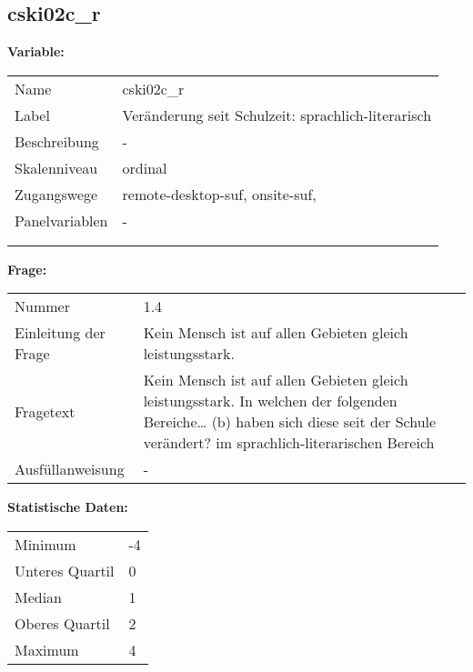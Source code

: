 	
	
	\subsection{cski02c\_r}
	\label{subSection:cski02c_r}

	\noindent\textbf{Variable:}\\
		\begin{tabular}{lL{11.3cm}}
			\label{tableVariable:cski02c_r}
			Name & cski02c\_r \\
			Label & Veränderung seit Schulzeit: sprachlich-literarisch \\
			Beschreibung & - \\
			Skalenniveau & ordinal \\
			Zugangswege &
				remote-desktop-suf,
				onsite-suf,
 \\
			Panelvariablen & -
			 \\
			 \\
 \\
		\end{tabular}

		\vspace*{1 cm}
		\noindent\textbf{Frage:}\\
		\begin{tabular}{lL{11.3cm}}
			\label{tableQuestion:cski02c_r}
			Nummer & 1.4 \\
			Einleitung der Frage & Kein Mensch ist auf allen Gebieten gleich leistungsstark. \\
			Fragetext & Kein Mensch ist auf allen Gebieten gleich leistungsstark. In welchen der folgenden Bereiche…
(b) haben sich diese seit der Schule verändert?
im sprachlich-literarischen Bereich \\
			Ausfüllanweisung & - \\
		\end{tabular}


		\vspace*{1 cm}
		\noindent\textbf{Statistische Daten:}\\
			\begin{tabular}{ll}
				\label{tableStatistics:cski02c_r}
					Minimum & -4 \\
					Unteres Quartil & 0 \\
					Median & 1 \\
					Oberes Quartil & 2 \\
					Maximum & 4 \\
			\end{tabular}




